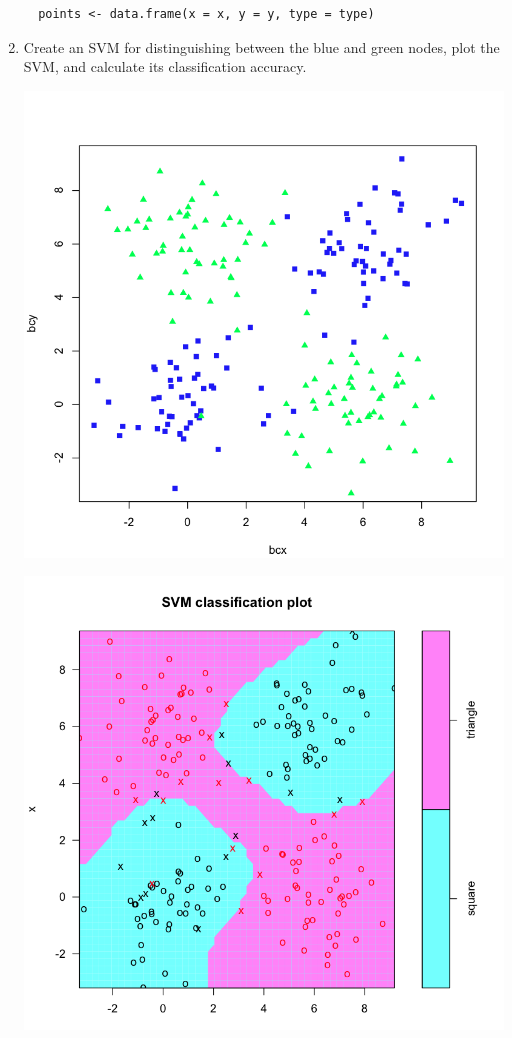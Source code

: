 \documentclass[11pt]{article}
\begin{document}
\begin{enumerate}
\begin{Verbatim}
  points <- data.frame(x = x, y = y, type = type)
  \end{Verbatim}
\item Create an SVM for distinguishing between the blue and green nodes, plot the 
  SVM, and calculate its classification accuracy.
\begin{center}
\includegraphics[scale=0.35]{points}
\end{center}

\begin{center}
\includegraphics[scale=0.35]{svmpoints}
\end{center}


\end{enumerate}
\end{document}
